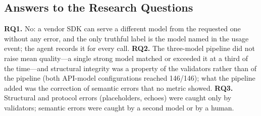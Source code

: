 \subsection{Answers to the Research Questions}
\textbf{RQ1.} No: a vendor SDK can serve a different model from the requested one without any error, and the only truthful label is the model named in the usage event; the agent records it for every call. \textbf{RQ2.} The three-model pipeline did not raise mean quality---a single strong model matched or exceeded it at a third of the time---and structural integrity was a property of the validators rather than of the pipeline (both API-model configurations reached 146/146); what the pipeline added was the correction of semantic errors that no metric showed. \textbf{RQ3.} Structural and protocol errors (placeholders, echoes) were caught only by validators; semantic errors were caught by a second model or by a human.
